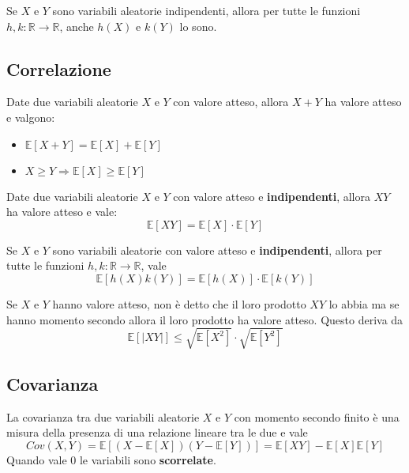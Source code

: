 \begin{proposition}
	Se $X$ e $Y$ sono variabili aleatorie indipendenti, allora per tutte le funzioni $h,k: \mathbb{R} \to \mathbb{R}$, anche $h(X)$ e $k(Y)$ lo sono.
\end{proposition}

\subsection{Correlazione}
\begin{proposition}
	Date due variabili aleatorie $X$ e $Y$ con valore atteso, allora $X+Y$ ha valore atteso e valgono:
	\begin{itemize}
		\item $\mathbb{E}[X+Y] = \mathbb{E}[X] + \mathbb{E}[Y]$
		\item $X \geq Y \Longrightarrow \mathbb{E}[X] \geq \mathbb{E}[Y]$
	\end{itemize}
\end{proposition}
\begin{proposition}
	Date due variabili aleatorie $X$ e $Y$ con valore atteso e \textbf{indipendenti}, allora $XY$ ha valore atteso e vale:
	\begin{equation}
		\mathbb{E}[XY] = \mathbb{E}[X] \cdot \mathbb{E}[Y]
	\end{equation}
\end{proposition}

\begin{proposition}
	Se $X$ e $Y$ sono variabili aleatorie con valore atteso e \textbf{indipendenti}, allora per tutte le funzioni $h,k: \mathbb{R} \to \mathbb{R}$, vale
	\begin{equation}
		\mathbb{E}[h(X)k(Y)]=\mathbb{E}[h(X)]\cdot\mathbb{E}[k(Y)]
	\end{equation}
\end{proposition}

\begin{proposition}
	Se $X$ e $Y$ hanno valore atteso, non è detto che il loro prodotto $XY$ lo abbia ma se hanno momento secondo allora il loro prodotto ha valore atteso. Questo deriva da
	\begin{equation}
		\mathbb{E}[\lvert XY \rvert] \leq \sqrt{\mathbb{E}[X^2]} \cdot \sqrt{\mathbb{E}[Y^2]}
	\end{equation}
\end{proposition}

\subsection{Covarianza}
\begin{definition}[Covarianza]
	La covarianza tra due variabili aleatorie $X$ e $Y$ con momento secondo finito è una misura della presenza di una relazione lineare tra le due e vale
	\begin{equation}
		Cov(X,Y) = \mathbb{E}[(X - \mathbb{E}[X])(Y-\mathbb{E}[Y])] = \mathbb{E}[XY] - \mathbb{E}[X]\mathbb{E}[Y]
	\end{equation}
	Quando vale $0$ le variabili sono \textbf{scorrelate}.
\end{definition}

